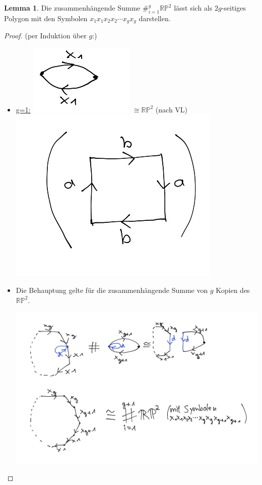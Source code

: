 \documentclass[a4paper,11pt,notitlepage]{report}
\theoremstyle{definition}
\newtheorem{lemma}{Lemma}[chapter]
\newcommand{\R}{{\ensuremath{\mathbb{R}}}}
\newcommand{\Prim}{{\ensuremath{\mathbb{P}}}}
\begin{document}
\begin{lemma}
	Die zusammenhängende Summe $\#_{i=1}^g{\R \Prim^2}$ lässt sich als $2g$-seitiges Polygon mit den Symbolen $x_1x_1x_2x_2 \cdots x_gx_g$ darstellen.
\end{lemma}

\begin{proof}{(per Induktion über $g$:)}
	\begin{itemize}
		\item \underline{g=1:} 
	\includegraphics[scale=0.3]{images/2012_01_30_Bild2.jpg} $\cong \R \Prim^2$ (nach VL)
	\includegraphics[scale=0.3]{images/2012_01_30_Bild3.jpg}
		\item Die Behauptung gelte für die zusammenhängende Summe von $g$ Kopien des $\R \Prim^2$.
		\begin{center}
		\includegraphics[scale=0.3]{images/2012_01_30_Bild4.jpg}
	\end{center}
	\end{itemize}
\end{proof}
\end{document}

